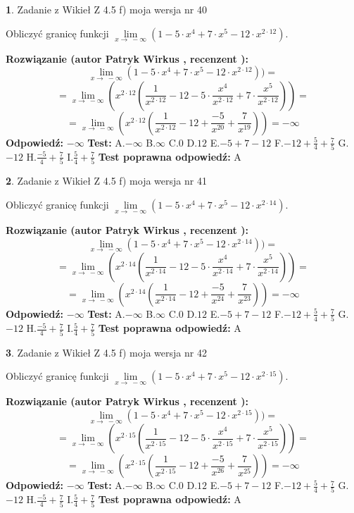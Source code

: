 \documentclass[12pt, a4paper]{article}
\theoremstyle{definition} %
\newtheorem{zad}{}
\newcommand{\zadStart}[1]{\begin{zad}#1\newline}
\newcommand{\zadStop}{\end{zad}}
\newcommand{\rozwStart}[2]{\noindent \textbf{Rozwiązanie (autor #1 , recenzent #2): }\newline}
\newcommand{\rozwStop}{\newline}
\newcommand{\odpStart}{\noindent \textbf{Odpowiedź:}\newline}
\newcommand{\odpStop}{\newline}
\newcommand{\testStart}{\noindent \textbf{Test:}\newline}
\newcommand{\testStop}{\newline}
\newcommand{\kluczStart}{\noindent \textbf{Test poprawna odpowiedź:}\newline}
\newcommand{\kluczStop}{\newline}
\begin{document}
\zadStart{Zadanie z Wikieł Z 4.5 f) moja wersja nr 40}



Obliczyć granicę funkcji  $\lim\limits_{x\to\ -\infty}(1 - 5 \cdot x^{4}+7 \cdot x^{5}- 12 \cdot x^{2\cdot12})$.
\zadStop
\rozwStart{Patryk Wirkus}{}
$$\lim\limits_{x\to\ -\infty}(1 - 5 \cdot x^{4}+7 \cdot x^{5}- 12 \cdot x^{2\cdot12}))=$$
$$=\lim\limits_{x\to\ -\infty}(x^{2\cdot12}(\frac{1}{x^{2\cdot12}}-12 -5 \cdot \frac{x^{4}}{x^{2\cdot12}}+7 \cdot \frac{x^{5}}{x^{2\cdot12}}))=$$
$$=\lim\limits_{x\to\ -\infty}(x^{2\cdot12}(\frac{1}{x^{2\cdot12}}-12 + \frac{-5}{x^{20}}+ \frac{7}{x^{19}}))=-\infty$$
\rozwStop
\odpStart
$-\infty$
\odpStop
\testStart
A.$-\infty$ B.$\infty$ C.$0$ D.$12$ E.$-5 + 7 - 12$
F.$-12+\frac{5}{4}+\frac{7}{5}$ G.$-12$
H.$\frac{-5}{4}+\frac{7}{5}$
I.$\frac{5}{4}+\frac{7}{5}$
\testStop
\kluczStart
A
\kluczStop



\zadStart{Zadanie z Wikieł Z 4.5 f) moja wersja nr 41}



Obliczyć granicę funkcji  $\lim\limits_{x\to\ -\infty}(1 - 5 \cdot x^{4}+7 \cdot x^{5}- 12 \cdot x^{2\cdot14})$.
\zadStop
\rozwStart{Patryk Wirkus}{}
$$\lim\limits_{x\to\ -\infty}(1 - 5 \cdot x^{4}+7 \cdot x^{5}- 12 \cdot x^{2\cdot14}))=$$
$$=\lim\limits_{x\to\ -\infty}(x^{2\cdot14}(\frac{1}{x^{2\cdot14}}-12 -5 \cdot \frac{x^{4}}{x^{2\cdot14}}+7 \cdot \frac{x^{5}}{x^{2\cdot14}}))=$$
$$=\lim\limits_{x\to\ -\infty}(x^{2\cdot14}(\frac{1}{x^{2\cdot14}}-12 + \frac{-5}{x^{24}}+ \frac{7}{x^{23}}))=-\infty$$
\rozwStop
\odpStart
$-\infty$
\odpStop
\testStart
A.$-\infty$ B.$\infty$ C.$0$ D.$12$ E.$-5 + 7 - 12$
F.$-12+\frac{5}{4}+\frac{7}{5}$ G.$-12$
H.$\frac{-5}{4}+\frac{7}{5}$
I.$\frac{5}{4}+\frac{7}{5}$
\testStop
\kluczStart
A
\kluczStop



\zadStart{Zadanie z Wikieł Z 4.5 f) moja wersja nr 42}



Obliczyć granicę funkcji  $\lim\limits_{x\to\ -\infty}(1 - 5 \cdot x^{4}+7 \cdot x^{5}- 12 \cdot x^{2\cdot15})$.
\zadStop
\rozwStart{Patryk Wirkus}{}
$$\lim\limits_{x\to\ -\infty}(1 - 5 \cdot x^{4}+7 \cdot x^{5}- 12 \cdot x^{2\cdot15}))=$$
$$=\lim\limits_{x\to\ -\infty}(x^{2\cdot15}(\frac{1}{x^{2\cdot15}}-12 -5 \cdot \frac{x^{4}}{x^{2\cdot15}}+7 \cdot \frac{x^{5}}{x^{2\cdot15}}))=$$
$$=\lim\limits_{x\to\ -\infty}(x^{2\cdot15}(\frac{1}{x^{2\cdot15}}-12 + \frac{-5}{x^{26}}+ \frac{7}{x^{25}}))=-\infty$$
\rozwStop
\odpStart
$-\infty$
\odpStop
\testStart
A.$-\infty$ B.$\infty$ C.$0$ D.$12$ E.$-5 + 7 - 12$
F.$-12+\frac{5}{4}+\frac{7}{5}$ G.$-12$
H.$\frac{-5}{4}+\frac{7}{5}$
I.$\frac{5}{4}+\frac{7}{5}$
\testStop
\kluczStart
A
\kluczStop
\end{document}
